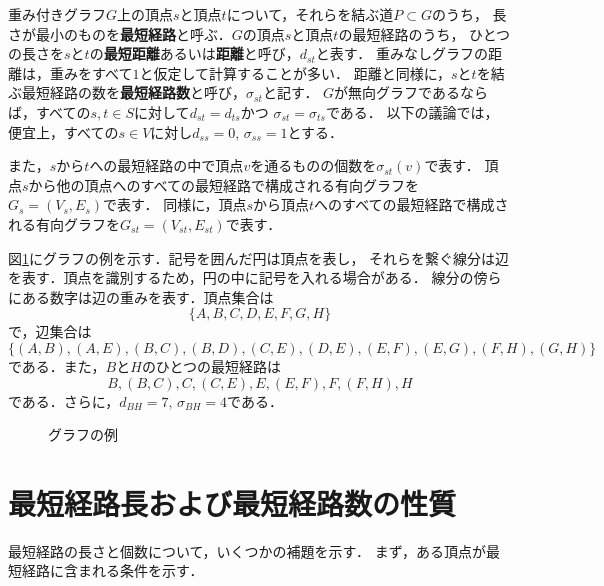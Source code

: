 重み付きグラフ$G$上の頂点$s$と頂点$t$について，それらを結ぶ道$P\subset G$のうち，
長さが最小のものを\textbf{最短経路}と呼ぶ．$G$の頂点$s$と頂点$t$の最短経路のうち，
ひとつの長さを$s$と$t$の\textbf{最短距離}あるいは\textbf{距離}と呼び，$d_{st}$と表す．
重みなしグラフの距離は，重みをすべて$1$と仮定して計算することが多い．
距離と同様に，$s$と$t$を結ぶ最短経路の数を\textbf{最短経路数}と呼び，$\sigma_{st}$と記す．
$G$が無向グラフであるならば，すべての$s,t\in S$に対して$d_{st}=d_{ts}$かつ
$\sigma_{st}=\sigma_{ts}$である．
以下の議論では，便宜上，すべての$s\in V$に対し$d_{ss}=0$, $\sigma_{ss}=1$とする．

また，$s$から$t$への最短経路の中で頂点$v$を通るものの個数を$\sigma_{st}(v)$で表す．
頂点$s$から他の頂点へのすべての最短経路で構成される有向グラフを$G_s=(V_s,E_s)$で表す．
同様に，頂点$s$から頂点$t$へのすべての最短経路で構成される有向グラフを$G_{st}=(V_{st},E_{st})$で表す．

\begin{example}
  図\ref{fig:graph-diamond}にグラフの例を示す．記号を囲んだ円は頂点を表し，
  それらを繋ぐ線分は辺を表す．頂点を識別するため，円の中に記号を入れる場合がある．
  線分の傍らにある数字は辺の重みを表す．頂点集合は
  \[ \{A,B,C,D,E,F,G,H\} \]
  で，辺集合は
  \[ \{(A,B),(A,E),(B,C),(B,D),(C,E),(D,E),(E,F),(E,G),(F,H),(G,H)\} \]
  である．また，$B$と$H$のひとつの最短経路は
  \[ B,(B,C),C,(C,E),E,(E,F),F,(F,H),H \]
  である．さらに，$d_{BH}=7,\,\sigma_{BH}=4$である．
  \begin{figure}
    \centering
    \def\svgwidth{.45\textwidth}
    
    \caption{グラフの例}
    \label{fig:graph-diamond}
  \end{figure}
\end{example}

\section{最短経路長および最短経路数の性質}
\label{sect:shortest-paths}

最短経路の長さと個数について，いくつかの補題を示す．
まず，ある頂点が最短経路に含まれる条件を示す．

